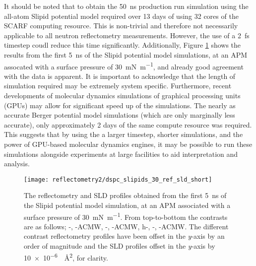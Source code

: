 It should be noted that to obtain the \SI{50}{\nano\second} production run simulation using the all-atom Slipid potential model required over 13 days of using 32 cores of the SCARF computing resource.
This is non-trivial and therefore not necessarily applicable to all neutron reflectometry measurements.
However, the use of a \SI{2}{\femto\second} timestep coudl reduce this time significantly.
Additionally, Figure \ref{fig:short} shows the results from the first \SI{5}{\nano\second} of the Slipid potential model simulations, at an APM assocated with a surface pressure of \SI{30}{\milli\newton\per\meter}, and already good agreement with the data is apparent.
It is important to acknowledge that the length of simulation required may be extremely system specific.
Furthermore, recent developments of molecular dynamics simulations of graphical processing units (GPUs) may allow for significant speed up of the simulations.
The nearly as accurate Berger potential model simulations (which are only marginally less accurate), only approximately 2 days of the same compute resource was required.
This suggests that by using the a larger timestep, shorter simulations, and the power of GPU-based molecular dynamics engines, it may be possible to run these simulations alongside experiments at large facilities to aid interpretation and analysis.
%
\begin{figure}
    \centering
    \texttt{[image: reflectometry2/dspc\_slipids\_30\_ref\_sld\_short]}
    \caption{The reflectometry and SLD profiles obtained from the first \SI{5}{\nano\second} of the Slipid potential model simulation, at an APM associated with a surface pressure of \SI{30}{\milli\newton\per\meter}. From top-to-bottom the contrasts are as follows; -, -ACMW, -, -ACMW, h-, -, -ACMW. The different contrast reflectometry profiles have been offset in the \emph{y}-axis by an order of magnitude and the SLD profiles offset in the \emph{y}-axis by \SI{10e-6}{\per\square\angstrom}, for clarity.}
    \label{fig:short}
\end{figure}
%

